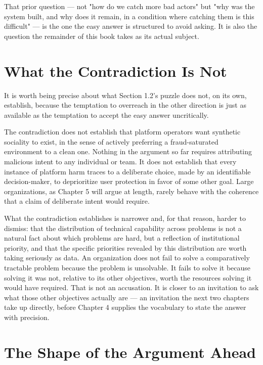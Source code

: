 \documentclass[12pt,a4paper]{book}
\begin{document}
That prior question — not "how do we catch more bad actors" but "why was the system built, and why does it remain, in a condition where catching them is this difficult" — is the one the easy answer is structured to avoid asking. It is also the question the remainder of this book takes as its actual subject.

\section{What the Contradiction Is Not}

It is worth being precise about what Section 1.2's puzzle does not, on its own, establish, because the temptation to overreach in the other direction is just as available as the temptation to accept the easy answer uncritically.

The contradiction does not establish that platform operators want synthetic sociality to exist, in the sense of actively preferring a fraud-saturated environment to a clean one. Nothing in the argument so far requires attributing malicious intent to any individual or team. It does not establish that every instance of platform harm traces to a deliberate choice, made by an identifiable decision-maker, to deprioritize user protection in favor of some other goal. Large organizations, as Chapter 5 will argue at length, rarely behave with the coherence that a claim of deliberate intent would require.

What the contradiction establishes is narrower and, for that reason, harder to dismiss: that the distribution of technical capability across problems is not a natural fact about which problems are hard, but a reflection of institutional priority, and that the specific priorities revealed by this distribution are worth taking seriously as data. An organization does not fail to solve a comparatively tractable problem because the problem is unsolvable. It fails to solve it because solving it was not, relative to its other objectives, worth the resources solving it would have required. That is not an accusation. It is closer to an invitation to ask what those other objectives actually are — an invitation the next two chapters take up directly, before Chapter 4 supplies the vocabulary to state the answer with precision.

\section{The Shape of the Argument Ahead}
\end{document}
